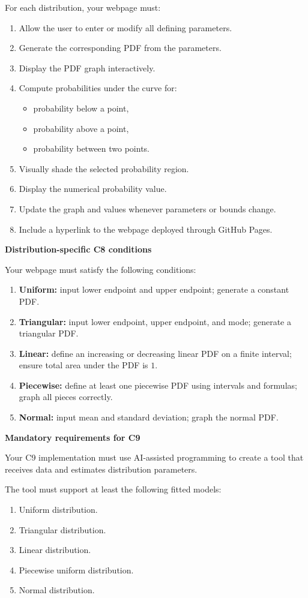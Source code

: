 \documentclass[12pt]{article}
\newcommand{\SubsectionBox}[1]{%
	\noindent\colorbox{gray!30}{%
		\parbox{\linewidth}{\textbf{#1}}%
	}\par\vspace{0.35cm}%
}
\begin{document}
	For each distribution, your webpage must:
	\begin{enumerate}
		\item Allow the user to enter or modify all defining parameters.
		\item Generate the corresponding PDF from the parameters.
		\item Display the PDF graph interactively.
		\item Compute probabilities under the curve for:
		\begin{itemize}
			\item probability below a point,
			\item probability above a point,
			\item probability between two points.
		\end{itemize}
		\item Visually shade the selected probability region.
		\item Display the numerical probability value.
		\item Update the graph and values whenever parameters or bounds change.
		\item Include a hyperlink to the webpage deployed through GitHub Pages.
	\end{enumerate}
	
	\SubsectionBox{Distribution-specific C8 conditions}
	Your webpage must satisfy the following conditions:
	\begin{enumerate}
		\item \textbf{Uniform:} input lower endpoint and upper endpoint; generate a constant PDF.
		\item \textbf{Triangular:} input lower endpoint, upper endpoint, and mode; generate a triangular PDF.
		\item \textbf{Linear:} define an increasing or decreasing linear PDF on a finite interval; ensure total area under the PDF is \(1\).
		\item \textbf{Piecewise:} define at least one piecewise PDF using intervals and formulas; graph all pieces correctly.
		\item \textbf{Normal:} input mean and standard deviation; graph the normal PDF.
	\end{enumerate}
	
	\SubsectionBox{Mandatory requirements for C9}
	Your C9 implementation must use AI-assisted programming to create a tool that receives data and estimates distribution parameters.
	
	The tool must support at least the following fitted models:
	\begin{enumerate}
		\item Uniform distribution.
		\item Triangular distribution.
		\item Linear distribution.
		\item Piecewise uniform distribution.
		\item Normal distribution.
	\end{enumerate}
	
\end{document}
